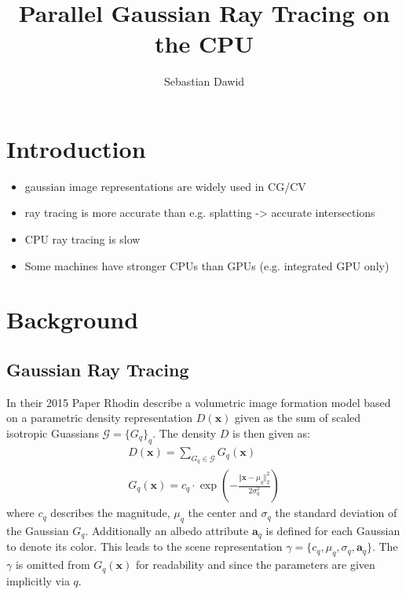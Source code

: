 \documentclass[a4paper, 11pt]{memoir}
\title{Parallel Gaussian Ray Tracing on the CPU}
\author{Sebastian Dawid}
\begin{document}
    \frontmatter
    \smarttitle
    \newpage
    \tableofcontents*

    \clearpage
    \thispagestyle{abs}
    \abstractintoc
    \begin{abstract}
        \lipsum[1]
    \end{abstract}

    \mainmatter
    \chapter{Introduction}
    \begin{itemize}
        \item gaussian image representations are widely used in CG/CV
        \item ray tracing is more accurate than e.g. splatting -> accurate intersections
        \item CPU ray tracing is slow
        \item Some machines have stronger CPUs than GPUs (e.g. integrated GPU only)
    \end{itemize}

    \chapter{Background}
    \label{ch:background}
    \section{Gaussian Ray Tracing}
    \label{sec:int_grt}
    In their 2015 Paper  \cite{Rhodin:2015} Rhodin \etal describe a volumetric image formation
    model based on a parametric density representation $D(\mathbf{x})$ given as the sum of scaled isotropic Guassians
    $\mathcal{G} = \{ G_q \}_q$. The density $D$ is then given as:
    \begin{align}
        D(\mathbf{x}) = \sum_{G_q \in \mathcal{G}} G_q(\mathbf{x})
        \label{eq:density}\\
        G_q(\mathbf{x}) = c_q \cdot \exp{\left( - \frac{\Vert\mathbf{x} - \mu_q\Vert_2^2}{2\sigma_q^2} \right)}
        \label{eq:gaussian}
    \end{align}
    where $c_q$ describes the magnitude, $\mu_q$ the center and $\sigma_q$ the standard deviation of the Gaussian $G_q$.
    Additionally an \gls{albedo} attribute $\mathbf{a}_q$ is defined for each Gaussian to denote its color. This leads
    to the scene representation $\gamma = \{ c_q, \mu_q, \sigma_q, \mathbf{a}_q \}$. The $\gamma$ is omitted from
    $G_q(\mathbf{x})$ for readability and since the parameters are given implicitly via $q$.
\end{document}
